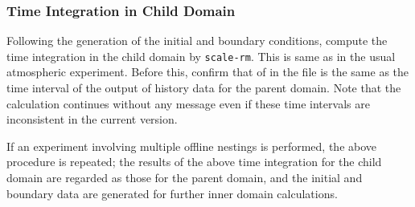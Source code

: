 \subsubsection{Time Integration in Child Domain}

Following the generation of the initial and boundary conditions, compute the time integration in the child domain by \verb|scale-rm|. This is same as in the usual atmospheric experiment. Before this, confirm that   of  in the file \runconf is the same as the time interval of the output of history data for the parent domain. Note that the calculation continues without any message even if these time intervals are inconsistent in the current version.

If an experiment involving multiple offline nestings is performed, the above procedure is repeated; the results of the above time integration for the child domain are regarded as those for the parent domain, and the initial and boundary data are generated for further inner domain calculations. 
